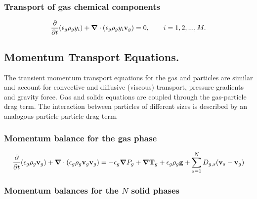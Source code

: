 
\subsubsection{\hspace{1cm}Transport of gas chemical components}

\begin{equation}
\frac{\partial}{\partial t}(\epsilon_{g}\rho_{g}y_{i})+
\mbox{\boldmath $\nabla$}\cdot (\epsilon_{g}\rho_{g}y_{i}{\bf v}_{g})=0,
\qquad i=1,2,...,M.
\label{eq:gc_mass}
\end{equation}

\subsection{Momentum Transport Equations.}
The transient momentum transport equations for the gas and particles are
similar and account for convective and diffusive (viscous) transport, 
pressure gradients and gravity force. Gas and solids
equations are coupled through the gas-particle drag term. The
interaction between particles of different sizes is described by an 
analogous particle-particle drag term.

\subsubsection{\hspace{1cm}Momentum balance for the gas phase}

\begin{equation}
\frac{\partial}{\partial t}(\epsilon_{g}\rho_{g}{\bf v}_{g})+
\mbox{\boldmath $\nabla$}\cdot (\epsilon_{g}\rho_{g}{\bf v}_{g}{\bf v}_{g})=
-\epsilon_{g}\mbox{\boldmath $\nabla$}P_{g}+
\mbox{\boldmath $\nabla$}{\bf T}_{g}
+\epsilon_{g}\rho_{g}{\bf g}+\sum_{s=1}^{N} D_{g,s}({\bf v}_{s}-{\bf v}_{g})
\label{eq:gas_mom}
\end{equation}


\subsubsection{\hspace{1cm}Momentum balances for the $N$ solid phases}

